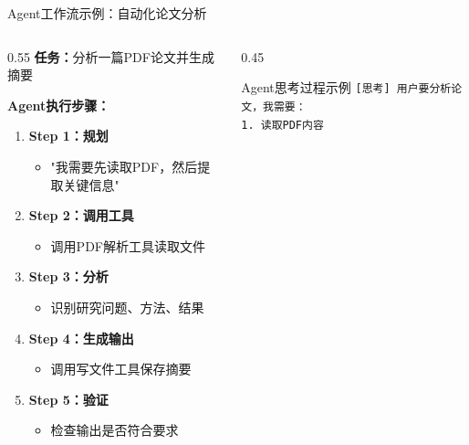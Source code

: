 \documentclass[aspectratio=169,11pt]{beamer}
\begin{document}
\begin{frame}{Agent工作流示例：自动化论文分析}
    \begin{columns}
        \begin{column}{0.55\textwidth}
            \textbf{任务：}分析一篇PDF论文并生成摘要
            
            \vspace{0.2cm}
            \textbf{Agent执行步骤：}
            \begin{enumerate}
                \item \textbf{Step 1：规划}
                    \begin{itemize}
                        \item "我需要先读取PDF，然后提取关键信息"
                    \end{itemize}
                \item \textbf{Step 2：调用工具}
                    \begin{itemize}
                        \item 调用PDF解析工具读取文件
                    \end{itemize}
                \item \textbf{Step 3：分析}
                    \begin{itemize}
                        \item 识别研究问题、方法、结果
                    \end{itemize}
                \item \textbf{Step 4：生成输出}
                    \begin{itemize}
                        \item 调用写文件工具保存摘要
                    \end{itemize}
                \item \textbf{Step 5：验证}
                    \begin{itemize}
                        \item 检查输出是否符合要求
                    \end{itemize}
            \end{enumerate}
        \end{column}
        \begin{column}{0.45\textwidth}
            \begin{exampleblock}{Agent思考过程示例}
                \scriptsize
                \texttt{[思考] 用户要分析论文，我需要：}\\
                \texttt{1. 读取PDF内容}\\

\end{exampleblock}
\end{column}
\end{columns}
\end{frame}
\end{document}

